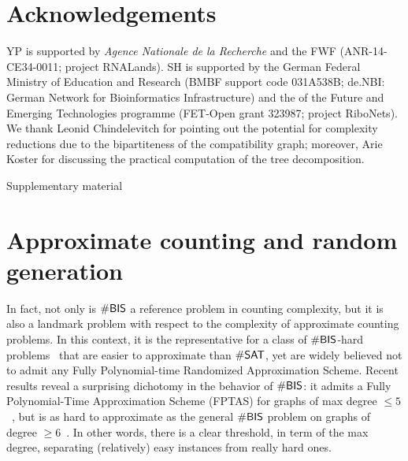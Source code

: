 \documentclass{bioinfo}
\begin{document}
\newpage 
\section*{Acknowledgements}
YP is supported 
by
{\em Agence
  Nationale de la Recherche} and the 
FWF (ANR-14-CE34-0011; project RNALands).  SH is supported by the
German Federal Ministry of Education and Research (BMBF support code
031A538B; de.NBI: German Network for Bioinformatics Infrastructure)
and the
of the Future and Emerging Technologies programme
(FET-Open grant 323987; project RiboNets).
%
We thank Leonid Chindelevitch for pointing out the potential for
complexity reductions due to the bipartiteness of the compatibility
graph; moreover, Arie Koster for discussing the practical computation
of the tree decomposition.



%
%
%
%
%
%
%



\newpage
\onecolumn

\appendix
{\centering {}Supplementary material\\%
}
\section{Approximate counting and random generation}
In fact, not only is $\#{\sf BIS}$ a reference problem in counting complexity, but it is also a landmark problem with respect to the complexity of approximate counting problems. In this context, it is the representative for a class of $\#{\sf BIS}$-hard problems~\cite{Bulatov2013} that are easier to approximate than $\# {\sf SAT}$, yet are widely believed not to admit any Fully Polynomial-time Randomized Approximation Scheme. Recent results reveal a surprising dichotomy in the behavior of $\#{\sf BIS}$: it admits a Fully Polynomial-Time Approximation Scheme (FPTAS) for graphs of max degree $\le 5$~\cite{Weitz2006}, but is as hard to approximate as the general $\#{\sf BIS}$ problem on graphs of degree $\ge 6$~\cite{Cai2016}. In other words, there is a clear threshold, in term of the max degree, separating (relatively) easy instances from really hard ones.
\end{document}
